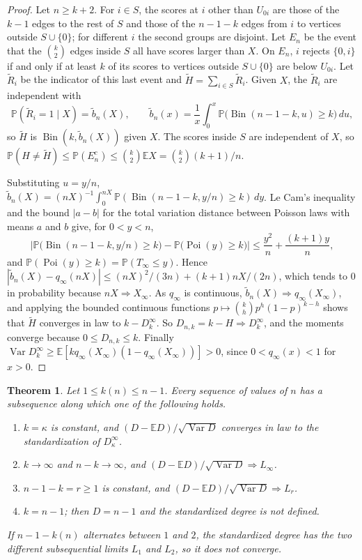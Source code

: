 \documentclass[11pt]{amsart}
\newtheorem{theorem}{Theorem}[section]
\theoremstyle{remark}
\numberwithin{equation}{section}
\newcommand{\E}{\mathbb E}
\newcommand{\Pp}{\mathbb P}
\newcommand{\1}{\mathbf 1}
\newcommand{\Var}{\operatorname{Var}}
\newcommand{\Bin}{\operatorname{Bin}}
\newcommand{\Poi}{\operatorname{Poi}}
\begin{document}
\begin{proof}
Let $n\ge k+2$. For $i\in S$, the scores at $i$ other than $U_{0i}$ are those of the $k-1$ edges to the rest of $S$ and those of the $n-1-k$ edges from $i$ to vertices outside $S\cup\{0\}$; for different $i$ the second groups are disjoint. Let $E_n$ be the event that the $\binom k2$ edges inside $S$ all have scores larger than $X$. On $E_n$, $i$ rejects $\{0,i\}$ if and only if at least $k$ of its scores to vertices outside $S\cup\{0\}$ are below $U_{0i}$. Let $\tilde R_i$ be the indicator of this last event and $\tilde H=\sum_{i\in S}\tilde R_i$. Given $X$, the $\tilde R_i$ are independent with
\[
\Pp(\tilde R_i=1\mid X)=\tilde b_n(X),\qquad \tilde b_n(x)=\frac1x\int_0^x\Pp\bigl(\Bin(n-1-k,u)\ge k\bigr)\,du,
\]
so $\tilde H$ is $\Bin(k,\tilde b_n(X))$ given $X$. The scores inside $S$ are independent of $X$, so $\Pp(H\ne\tilde H)\le\Pp(E_n^c)\le\binom k2\E X=\binom k2(k+1)/n$.

Substituting $u=y/n$, $\tilde b_n(X)=(nX)^{-1}\int_0^{nX}\Pp(\Bin(n-1-k,y/n)\ge k)\,dy$. Le Cam's inequality and the bound $|a-b|$ for the total variation distance between Poisson laws with means $a$ and $b$ give, for $0<y<n$,
\[
\bigl|\Pp\bigl(\Bin(n-1-k,y/n)\ge k\bigr)-\Pp\bigl(\Poi(y)\ge k\bigr)\bigr|\le\frac{y^2}n+\frac{(k+1)y}n,
\]
and $\Pp(\Poi(y)\ge k)=\Pp(T_\infty\le y)$. Hence $|\tilde b_n(X)-q_\infty(nX)|\le(nX)^2/(3n)+(k+1)nX/(2n)$, which tends to $0$ in probability because $nX\Rightarrow X_\infty$. As $q_\infty$ is continuous, $\tilde b_n(X)\Rightarrow q_\infty(X_\infty)$, and applying the bounded continuous functions $p\mapsto\binom kh p^h(1-p)^{k-h}$ shows that $\tilde H$ converges in law to $k-D_k^\infty$. So $D_{n,k}=k-H\Rightarrow D_k^\infty$, and the moments converge because $0\le D_{n,k}\le k$. Finally $\Var D_k^\infty\ge\E[kq_\infty(X_\infty)(1-q_\infty(X_\infty))]>0$, since $0<q_\infty(x)<1$ for $x>0$.
\end{proof}

\begin{theorem}\label{thm:class}
Let $1\le k(n)\le n-1$. Every sequence of values of $n$ has a subsequence along which one of the following holds.
\begin{enumerate}[label=(\roman*)]
\item $k=\kappa$ is constant, and $(D-\E D)/\sqrt{\Var D}$ converges in law to the standardization of $D_\kappa^\infty$.
\item $k\to\infty$ and $n-k\to\infty$, and $(D-\E D)/\sqrt{\Var D}\Rightarrow L_\infty$.
\item $n-1-k=r\ge1$ is constant, and $(D-\E D)/\sqrt{\Var D}\Rightarrow L_r$.
\item $k=n-1$; then $D=n-1$ and the standardized degree is not defined.
\end{enumerate}
If $n-1-k(n)$ alternates between $1$ and $2$, the standardized degree has the two different subsequential limits $L_1$ and $L_2$, so it does not converge.
\end{theorem}
\end{document}
